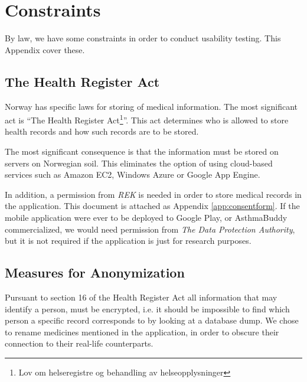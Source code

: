 
\chapter{Constraints}
\label{chp:securityrequirements}

By law, we have some constraints in order to conduct usability testing. This Appendix cover these. 

\section{The Health Register Act}
\label{sec:helseregisterloven}

Norway has specific laws for storing of medical information. The most significant act is ``The Health Register Act\footnote{Lov om helseregistre og behandling av helseopplysninger}''\cite{helseregisterloven}. This act determines who is allowed to store health records and how such records are to be stored. 

The most significant consequence is that the information must be stored on servers on Norwegian soil. This eliminates the option of using cloud-based services such as Amazon EC2, Windows Azure or Google App Engine. 

In addition, a permission from \emph{REK} is needed in order to store medical records in the application. This document is attached as Appendix \ref{app:consentform}. If the mobile application were ever to be deployed to Google Play, or AsthmaBuddy commercialized, we would need permission from \emph{The Data Protection Authority}, but it is not required if the application is just for research purposes. 

\section{Measures for Anonymization}
\label{sec:measuresforanonymization}
Pursuant to section 16 of the Health Register Act\cite{helseregisterloven} all information that may identify a person, must be encrypted, i.e. it should be impossible to find which person a specific record corresponds to by looking at a database dump. We chose to rename medicines mentioned in the application, in order to obscure their connection to their real-life counterparts. 